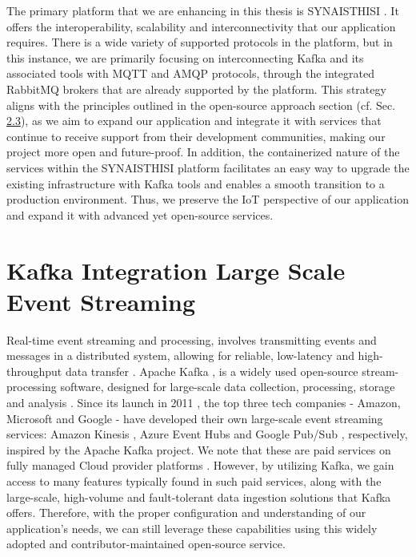 The primary platform that we are enhancing in this thesis is SYNAISTHISI \cite{Synaisthisi}. It offers the interoperability, scalability and interconnectivity that our application requires. There is a wide variety of supported protocols in the platform, but in this instance, we are primarily focusing on interconnecting Kafka and its associated tools with MQTT and AMQP protocols, through the integrated RabbitMQ brokers that are already supported by the platform. This strategy aligns with the principles outlined in the open-source approach section (cf. Sec. \hyperref[open_source_approach]{2.3}), as we aim to expand our application and integrate it with services that continue to receive support from their development communities, making our project more open and future-proof. In addition, the containerized nature of the services within the SYNAISTHISI platform facilitates an easy way to upgrade the existing infrastructure with Kafka tools and enables a smooth transition to a production environment. Thus, we preserve the IoT perspective of our application and expand it with advanced yet open-source services.

\section{Kafka Integration Large Scale Event Streaming }

Real-time event streaming and processing, involves transmitting events and messages in a distributed system, allowing for reliable, low-latency and high-throughput data transfer \cite{EventStreamingPlatform}. 
Apache Kafka \cite{WhatIsApacheKafka}, is a widely used open-source stream-processing software, designed for large-scale data collection, processing, storage and analysis \cite{KafkaApachePoweredBy}. Since its launch in 2011 \cite{WhatIsApacheKafka}, the top three tech companies - Amazon, Microsoft and Google - have developed their own large-scale event streaming services: Amazon Kinesis \cite{AmazonKinesis}, Azure Event Hubs \cite{AzureEventHubs} and Google Pub/Sub \cite{GooglePub/Sub}, respectively, inspired by the Apache Kafka project. We note that these are paid services on fully managed Cloud provider platforms \cite{CloudNativeApplications}. However, by utilizing Kafka, we gain access to many features typically found in such paid services, along with the large-scale, high-volume and fault-tolerant data ingestion solutions that Kafka offers. Therefore, with the proper configuration and understanding of our application's needs, we can still leverage these capabilities using this widely adopted and contributor-maintained open-source service.